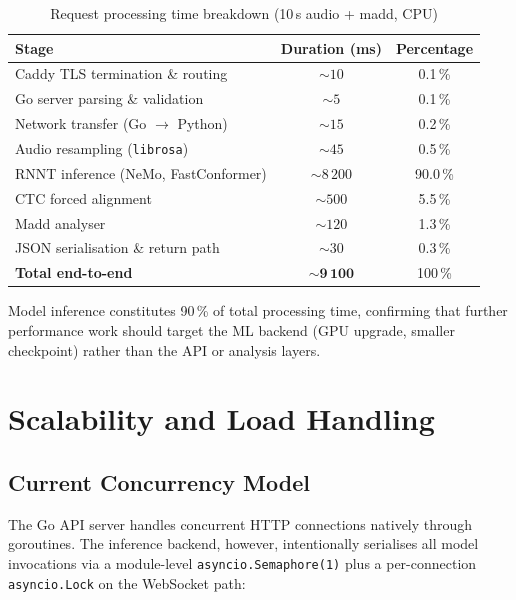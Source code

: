 \begin{table}[H]
  \centering
  \caption{Request processing time breakdown (10\,s audio + madd, CPU)}
  \label{tab:perf_breakdown}
  \renewcommand{\arraystretch}{1.3}
  \begin{tabular}{lcc}
    \toprule
    \textbf{Stage} & \textbf{Duration (ms)} & \textbf{Percentage} \\
    \midrule
    Caddy TLS termination \& routing      & ${\sim}10$    & 0.1\,\% \\
    Go server parsing \& validation       & ${\sim}5$     & 0.1\,\% \\
    Network transfer (Go $\rightarrow$ Python) & ${\sim}15$ & 0.2\,\% \\
    Audio resampling (\texttt{librosa})   & ${\sim}45$    & 0.5\,\% \\
    RNNT inference (NeMo, FastConformer)  & ${\sim}8\,200$ & 90.0\,\% \\
    CTC forced alignment                  & ${\sim}500$   & 5.5\,\% \\
    Madd analyser                         & ${\sim}120$   & 1.3\,\% \\
    JSON serialisation \& return path     & ${\sim}30$    & 0.3\,\% \\
    \midrule
    \textbf{Total end-to-end}             & ${\sim}\mathbf{9\,100}$ & 100\,\% \\
    \bottomrule
  \end{tabular}
\end{table}

Model inference constitutes 90\,\% of total processing time, confirming that further performance work should target the ML backend (GPU upgrade, smaller checkpoint) rather than the API or analysis layers.

\chapter{Scalability and Load Handling}

\section{Current Concurrency Model}

The Go API server handles concurrent HTTP connections natively through goroutines. The inference backend, however, intentionally serialises all model invocations via a module-level \texttt{asyncio.Semaphore(1)} plus a per-connection \texttt{asyncio.Lock} on the WebSocket path:

